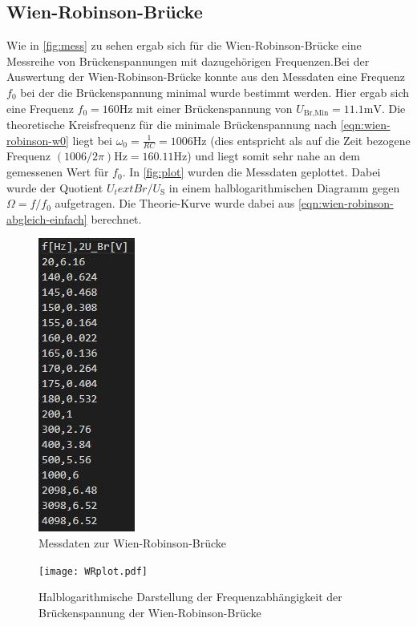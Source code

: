 \subsection{Wien-Robinson-Brücke}
Wie in \autoref{fig:mess} zu sehen ergab sich für die Wien-Robinson-Brücke eine Messreihe von Brückenspannungen mit dazugehörigen Frequenzen.Bei der Auswertung der Wien-Robinson-Brücke konnte aus den Messdaten eine Frequenz $f_0$ bei der die Brückenspannung minimal wurde bestimmt werden. Hier ergab sich eine Frequenz $f_0=160 \si{\hertz}$ mit einer Brückenspannung von $U_\text{Br,Min}=11.1 \si{\milli} \si{\volt}$. Die theoretische Kreisfrequenz für die minimale Brückenspannung nach \autoref{eqn:wien-robinson-w0} liegt bei $\omega_0=\frac{1}{RC}=1006\si{\hertz}$ (dies entspricht als auf die Zeit bezogene Frequenz $(1006/2\pi)\si{\hertz}=160.11\si{\hertz}$) und liegt somit sehr nahe an dem gemessenen Wert für $f_0$. In \autoref{fig:plot} wurden die Messdaten geplottet. Dabei wurde der Quotient $U_text{Br}/U_\text{S}$ in einem halblogarithmischen Diagramm gegen $\Omega=f/f_0$ aufgetragen. Die Theorie-Kurve wurde dabei aus \autoref{eqn:wien-robinson-abgleich-einfach} berechnet.
\begin{figure}
  \centering
  \includegraphics{daten/WienR.JPG}
  \caption{Messdaten zur Wien-Robinson-Brücke}
  \label{fig:mess}
\end{figure}


\begin{figure}
  \centering
  \texttt{[image: WRplot.pdf]}
  \caption{Halblogarithmische Darstellung der Frequenzabhängigkeit der Brückenspannung der Wien-Robinson-Brücke}
  \label{fig:plot}
\end{figure}
\newpage

